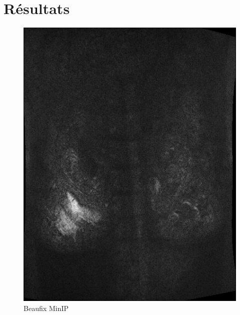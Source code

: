 \documentclass[a4paper,11pt]{article}
\begin{document}
\section{Résultats}

\begin{figure}[[!h]
	\begin{minipage}[c]{.22\linewidth}
     \center
	\includegraphics[scale=0.26]{beaufix_MinIP.jpg}
	\caption{Beaufix MinIP}
   \end{minipage} \hfill
	\begin{minipage}[c]{.22\linewidth}
      \center

\end{minipage}
\end{figure}
\end{document}
